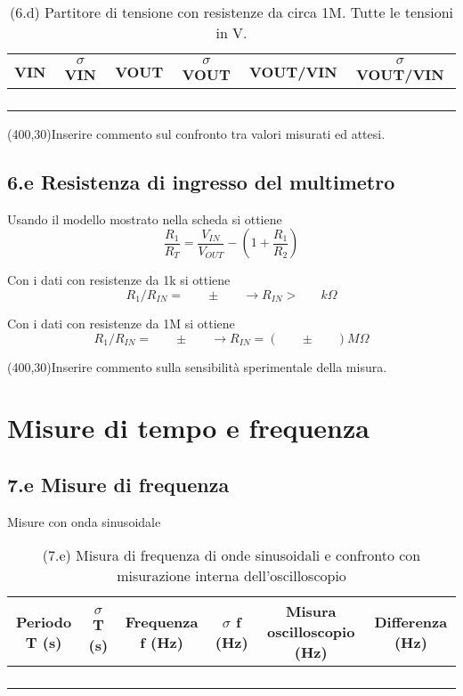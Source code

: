 \documentclass[10pt,a4paper]{article}
\newcommand{\exn}{\phantom{xxx}}
\begin{document}
\begin{table}[h]
\centering
\begin{tabular}{|c|c|c|c|c|c|}
\hline 
VIN& $\sigma$ VIN  &VOUT	 & $\sigma$ VOUT& VOUT/VIN & $\sigma$ VOUT/VIN \\
\hline 
\exn & \exn & \exn & \exn & \exn &\exn \\
\exn & \exn & \exn & \exn & \exn &\exn \\
\exn & \exn & \exn & \exn & \exn &\exn \\
\exn & \exn & \exn & \exn & \exn &\exn \\
\hline 
\end{tabular} 
\caption{(6.d) Partitore di tensione con resistenze da circa 1M. Tutte le tensioni in V.\label{t:par2}}
\end{table}


\framebox(400,30){Inserire commento sul confronto tra valori misurati ed attesi.}



\subsection*{6.e Resistenza di ingresso del multimetro}
Usando il modello mostrato nella scheda si ottiene
\[ \frac{R_1}{R_T} =  \frac{V_{IN}}{V_{OUT}} - (1 +  \frac{R_1}{R_2} )
\]

Con i dati con resistenze da 1k si ottiene
\[ R_1/R_{IN} = \exn  \pm  \exn   \rightarrow  R_{IN} > \exn k\Omega
\]


Con i dati con resistenze da 1M si ottiene
\[ R_1/R_{IN} = \exn  \pm  \exn   \rightarrow  R_{IN} = (\exn \pm  \exn)  M\Omega
\]

\framebox(400,30){Inserire commento sulla sensibilit\`a sperimentale della misura.} 




\section{Misure di tempo e frequenza}

\subsection*{7.e Misure di frequenza}
Misure con onda sinusoidale
\begin{table}[h]
\centering
\begin{tabular}{|c|c|c|c|c|c|}
\hline 
Periodo T (s)& $\sigma$ T (s)  &Frequenza f (Hz) & $\sigma$ f (Hz) & Misura oscilloscopio (Hz) & Differenza (Hz)\\
\hline 
\exn & \exn & \exn & \exn & \exn &\exn \\
\exn & \exn & \exn & \exn & \exn &\exn \\
\exn & \exn & \exn & \exn & \exn &\exn \\
\exn & \exn & \exn & \exn & \exn &\exn \\
\hline 
\end{tabular} 
\caption{(7.e) Misura di frequenza di onde sinusoidali  e confronto con misurazione interna dell'oscilloscopio }
\end{table}
\end{document}
